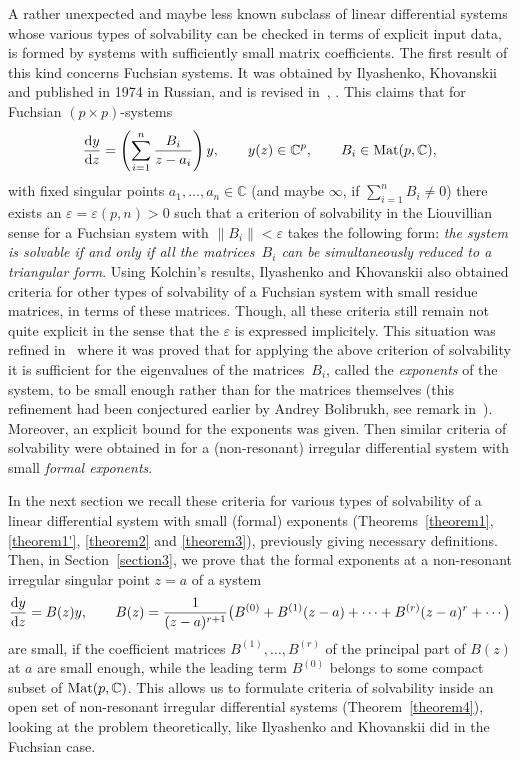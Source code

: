 \documentclass[pdftex]{sigma}
\numberwithin{equation}{section}
\begin{document}
A rather unexpected and maybe less known subclass of linear differential systems whose various types of solvability
can be checked in terms of explicit input data, is formed by systems with sufficiently small matrix coefficients.
The first result of this kind concerns Fuchsian systems. It was obtained by Ilyashenko, Khovanskii and published in
1974 in Russian, and is revised in~\cite{Kh1}, \cite[Chapter~6, Section~2.3]{Kh2}. This claims that for Fuchsian $(p\times p)$-systems
\begin{gather*}
\frac{{\rm d}y}{{\rm d}z}=\left(\sum_{i=1}^n\frac{B_i}{z-a_i}\right)y, \qquad y(z)\in{\mathbb C}^p, \qquad B_i\in{\rm Mat}(p,{\mathbb C}),
\end{gather*}
with fixed singular points $a_1,\ldots,a_n\in\mathbb C$ (and maybe $\infty$, if $\sum\limits_{i=1}^nB_i\ne0$) there exists an
$\varepsilon=\varepsilon(p,n)>0$ such that a criterion of solvability in the Liouvillian sense for a Fuchsian system
with $\|B_i\|<\varepsilon$ takes the following form: {\it the system is solvable if and only if all the matrices~$B_i$ can be
simultaneously reduced to a triangular form}. Using Kolchin's results, Ilyashenko and Khovanskii also obtained criteria for
other types of solvability of a Fuchsian system with small residue matrices, in terms of these matrices. Though, all these
criteria still remain not quite explicit in the sense that the $\varepsilon$ is expressed implicitely. This situation was
refined in~\cite{VG} where it was proved that for applying the above criterion of solvability it is sufficient for the eigenvalues of the matrices~$B_i$, called the {\it exponents} of the system, to be small enough rather than for the matrices themselves (this refinement had been conjectured earlier by Andrey Bolibrukh, see remark in~\cite[Section~6.2.3]{Kh1}). Moreover, an explicit bound for the exponents was given. Then similar criteria of solvability were obtained in \cite{GV} for a (non-resonant) irregular differential system with small {\it formal exponents}.

In the next section we recall these criteria for various types of solvability of a linear differential system with small (formal) exponents (Theorems~\ref{theorem1}, \ref{theorem1'}, \ref{theorem2} and \ref{theorem3}), previously giving necessary definitions. Then, in Section~\ref{section3}, we prove that the formal exponents at a non-resonant irregular singular point $z=a$ of a system
\begin{gather}\label{syst1}
\frac{{\rm d}y}{{\rm d}z}=B(z) y, \qquad B(z)=\frac1{(z-a)^{r+1}}\bigl(B^{(0)}+B^{(1)}(z-a)+\cdots+B^{(r)}(z-a)^r+\cdots\bigr)
\end{gather}
are small, if the coefficient matrices $B^{(1)},\ldots,B^{(r)}$ of the principal part of $B(z)$ at $a$ are small enough, while the leading term $B^{(0)}$ belongs to some compact subset of ${\rm Mat}(p,{\mathbb C})$. This allows us to formulate criteria of solvability inside an open set of non-resonant irregular differential systems (Theorem~\ref{theorem4}), looking at the problem theoretically, like Ilyashenko and Khovanskii did in the Fuchsian case.
\end{document}
